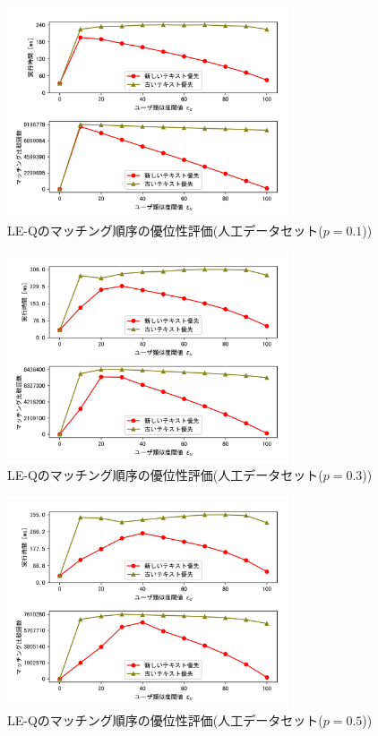 \begin{figure}[H]
    \centering
    \includegraphics[width=8.3cm]{eimg/exp2_1.png}
    \caption{LE-Qのマッチング順序の優位性評価(人工データセット($p=0.1$))}
    \label{fig:exp2_1}
\end{figure}
\begin{figure}[H]
    \centering
    \includegraphics[width=8.3cm]{eimg/exp2_3.png}
    \caption{LE-Qのマッチング順序の優位性評価(人工データセット($p=0.3$))}
    \label{fig:exp2_3}
\end{figure}
\begin{figure}[H]
    \centering
    \includegraphics[width=8.3cm]{eimg/exp2_5.png}
    \caption{LE-Qのマッチング順序の優位性評価(人工データセット($p=0.5$))}
    \label{fig:exp2_5}
\end{figure}
